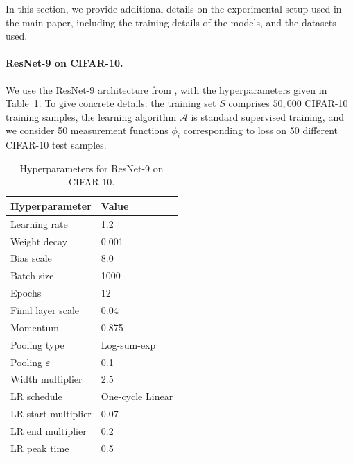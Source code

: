 In this section, we provide additional details on the experimental setup used in
the main paper, including the training details of the models,
and the datasets used.

\paragraph{ResNet-9 on CIFAR-10.} We use the ResNet-9 architecture from
\citep{jordan202494}, with the hyperparameters given in
Table~\ref{tab:resnet9_cifar10_hyperparams}. To give concrete details: the
training set $S$ comprises $50,000$ CIFAR-10 training samples, the
learning algorithm
$\mathcal{A}$ is standard supervised training, and we consider 50 measurement
functions $\phi_i$ corresponding to loss on 50 different CIFAR-10 test samples.

\begin{table}[h]
  \centering
  \begin{tabular}{ll}
    \toprule
    Hyperparameter & Value \\
    \midrule
    Learning rate & 1.2 \\
    Weight decay & 0.001 \\
    Bias scale & 8.0 \\
    Batch size & 1000 \\
    Epochs & 12 \\
    Final layer scale & 0.04 \\
    Momentum & 0.875 \\
    Pooling type & Log-sum-exp \\
    Pooling $\varepsilon$ & 0.1 \\
    Width multiplier & 2.5 \\
    LR schedule & One-cycle Linear \\
    LR start multiplier & 0.07 \\
    LR end multiplier & 0.2 \\
    LR peak time & 0.5 \\
    \bottomrule
  \end{tabular}
  \caption{Hyperparameters for ResNet-9 on CIFAR-10.}
  \label{tab:resnet9_cifar10_hyperparams}
\end{table}

